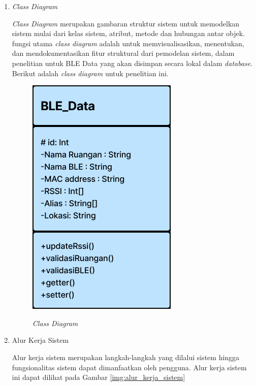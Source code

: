 \begin{enumerate}
\newpage

\item \textit{Class Diagram}
\par \textit{Class Diagram} merupakan gambaran struktur sistem untuk memodelkan sistem mulai dari kelas sistem, atribut, metode dan hubungan antar objek. fungsi utama \textit{class diagram} adalah untuk memvisualisasikan, menentukan, dan mendokumentasikan fitur struktural dari pemodelan sistem, dalam penelitian untuk BLE Data yang akan disimpan secara lokal dalam \textit{database}. Berikut adalah \textit{class diagram} untuk penelitian ini.

\begin{figure}[H]
\centering
{\includegraphics [scale = 0.5]{gambar/bab4/Class-Diagram}}
\caption{\textit{Class Diagram}}
\label{img:class_diagram}
\end{figure}

\newpage


\item Alur Kerja Sistem

\par Alur kerja sistem merupakan langkah-langkah yang dilalui sistem hingga fungsionalitas sistem dapat dimanfaatkan oleh pengguna. Alur kerja sistem ini dapat dilihat pada Gambar \ref{img:alur_kerja_sistem}


\end{enumerate}
